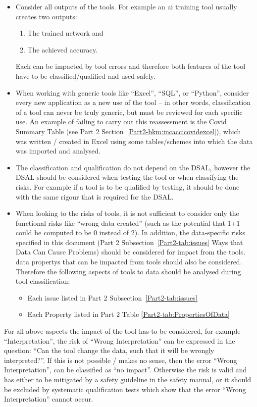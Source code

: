 \begin{itemize}
\item Consider all outputs of the tools.
  For example an \gls{ai} training tool usually creates two outputs:
  \begin{enumerate}
  \item The trained network and
  \item The achieved \gls{accuracy}.
  \end{enumerate}
  Each can be impacted by tool errors and therefore both features of the tool have to be classified/qualified  and used safely.
\item When working with generic tools like ``Excel'', ``SQL'', or ``Python'',
consider every new application as a new use of the tool -- in other words, classification of a tool can never be truly generic, but must be reviewed for each specific use. 
  An example of failing to carry out this reassessment is the Covid Summary Table (see Part 2 Section~\ref*{Part2-bkm:incacc:covidexcel}),
  which was written / created in Excel using some tables/schemes into which the data was imported and analysed.
\item The classification and qualification do not depend on the DSAL, however the DSAL should be considered when testing the tool or when classifying the risks.
  For example if a tool is to be qualified by testing, it should be done with the same rigour that is required  for the DSAL. 
\item When looking to the risks of tools, it is not sufficient to consider only the functional risks like ``wrong data created''
  (such as the potential that 1+1 could be computed to be 0 instead of 2).
  In addition, the data-specific risks specified in this document
  (Part 2 Subsection~\ref*{Part2-tab:issues} Ways that Data Can Cause  Problems) should be considered for impact from the tools.
  \Glspl{data property} that can be impacted from tools should also be considered.
  Therefore the following aspects of tools to data should be analysed during tool classification:
  \begin{itemize}
  \item Each issue listed in Part 2 Subsection~\ref*{Part2-tab:issues}
  \item Each Property listed in Part 2 Table \ref*{Part2-tab:PropertiesOfData}
  \end{itemize}    
\end{itemize}

For all above aspects the impact of the tool has to be considered, for example ``Interpretation'',
the risk of ``Wrong Interpretation'' can be expressed in the question:
``Can the tool change the data, such that it will be wrongly interpreted?''.
If this is not possible / makes no sense, then the error ``Wrong Interpretation'', can be classified as ``no impact''.
Otherwise the risk is valid and has either to be mitigated by a safety guideline in the safety manual,
or it should be excluded by systematic qualification  tests which show that the error ``Wrong Interpretation'' cannot occur.  
